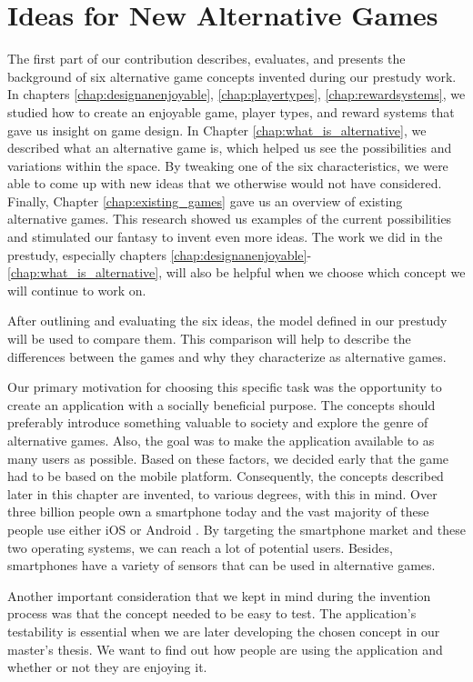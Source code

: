 \documentclass[../Main.tex]{subfiles}
\begin{document}
\section{Ideas for New Alternative Games}
\label{chap:ideas}
The first part of our contribution describes, evaluates, and presents the background of six alternative game concepts invented during our prestudy work. 
In chapters \ref{chap:designanenjoyable}, \ref{chap:playertypes}, \ref{chap:rewardsystems}, we studied how to create an enjoyable game, player types, and reward systems that gave us insight on game design. In Chapter \ref{chap:what_is_alternative}, we described what an alternative game is, which helped us see the possibilities and variations within the space. By tweaking one of the six characteristics, we were able to come up with new ideas that we otherwise would not have considered. Finally, Chapter \ref{chap:existing_games} gave us an overview of existing alternative games. This research showed us examples of the current possibilities and stimulated our fantasy to invent even more ideas. The work we did in the prestudy, especially chapters \ref{chap:designanenjoyable}-\ref{chap:what_is_alternative}, will also be helpful when we choose which concept we will continue to work on.

After outlining and evaluating the six ideas, the model defined in our prestudy will be used to compare them. This comparison will help to describe the differences between the games and why they characterize as alternative games.

Our primary motivation for choosing this specific task was the opportunity to create an application with a socially beneficial purpose. The concepts should preferably introduce something valuable to society and explore the genre of alternative games. Also, the goal was to make the application available to as many users as possible. Based on these factors, we decided early that the game had to be based on the mobile platform. Consequently, the concepts described later in this chapter are invented, to various degrees, with this in mind. Over three billion people own a smartphone today \citep{odea_smartphone_2020} and the vast majority of these people use either iOS or Android \citep{statcounter_mobile_2020}. By targeting the smartphone market and these two operating systems, we can reach a lot of potential users. Besides, smartphones have a variety of sensors that can be used in alternative games.

Another important consideration that we kept in mind during the invention process was that the concept needed to be easy to test. The application’s testability is essential when we are later developing the chosen concept in our master’s thesis. We want to find out how people are using the application and whether or not they are enjoying it.
\end{document}
